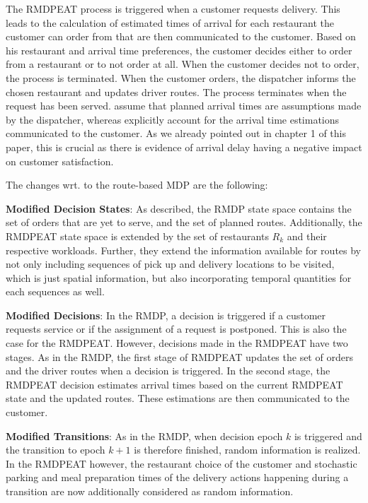 The RMDPEAT process is triggered when a customer requests delivery. This leads to the calculation of estimated times of arrival for each restaurant the customer can order from that are then communicated to the customer. Based on his restaurant and arrival time preferences, the customer decides either to order from a restaurant or to not order at all. When the customer decides not to order, the process is terminated. When the customer orders, the dispatcher informs the chosen restaurant and updates driver routes. The process terminates when the request has been served. 
\cite{UlmerBarrett2017_TWAP} assume that planned arrival times are assumptions made by the dispatcher, whereas \cite{Hildebrandt2020_EAT} explicitly account for the arrival time estimations communicated to the customer. As we already pointed out in chapter 1 of this paper, this is crucial as there is evidence of arrival delay having a negative impact on customer satisfaction.

The changes wrt. to the route-based MDP are the following:
\begin{description}[font=$\bullet$\scshape\bfseries]
	\item \textbf{Modified Decision States}: As described, the RMDP state space contains the set of orders that are yet to serve, and the set of planned routes. Additionally, the RMDPEAT state space is extended by the set of restaurants $ R_k $ and their respective workloads. Further, they extend the information available for routes by not only including sequences of pick up and delivery locations to be visited, which is just spatial information, but also incorporating temporal quantities for each sequences as well. 
	\item \textbf{Modified Decisions}: 
	In the RMDP, a decision is triggered if a customer requests service or if the assignment of a request is postponed. This is also the case for the RMDPEAT. However, decisions made in the RMDPEAT have two stages. As in the RMDP, the first stage of RMDPEAT updates the set of orders and the driver routes when a decision is triggered. In the second stage, the RMDPEAT decision estimates arrival times based on the current RMDPEAT state and the updated routes. These estimations are then communicated to the customer.  
	\item \textbf{Modified Transitions}: As in the RMDP, when decision epoch $ k $ is triggered and the transition to epoch $ k+1 $ is therefore finished, random information is realized. In the RMDPEAT however, the restaurant choice of the customer and stochastic parking and meal preparation times of the delivery actions happening during a transition are now additionally considered as random information. 
\end{description}

